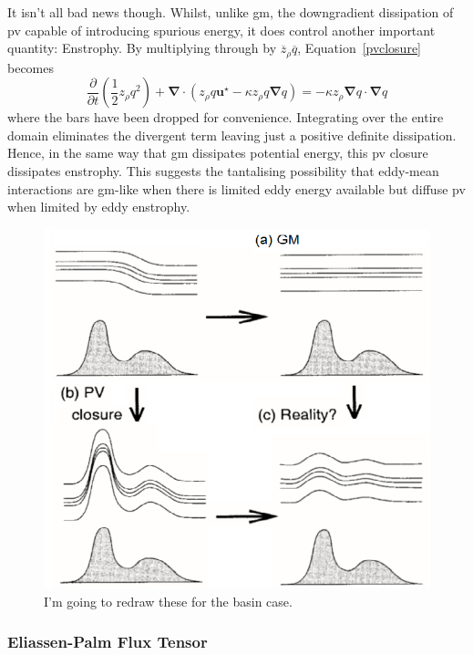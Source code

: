 \documentclass[10pt,a4paper]{article}
\newcommand*\mean[1]{\overline{#1}}
\newcommand*\equref[1]{Equation~\ref{#1}}
\begin{document}
                It isn't all bad news though. Whilst, unlike \gls{gm}, the downgradient
                dissipation of \gls{pv} capable of introducing spurious energy, it does
                control another important quantity: Enstrophy. By multiplying through 
                by $\mean{z}_{\rho} \mean{q}$, \equref{pvclosure} becomes 
                \begin{equation}
                \frac{\partial  }{\partial t}\left(\frac{1}{2}z_{\rho}q^{2}\right) + \boldsymbol{\nabla}\cdot\left(z_{\rho}q\boldsymbol{u}^\star-\kappa z_{\rho}q\boldsymbol{\nabla} q
                \right)=-\kappa z_\rho \boldsymbol{\nabla}q\cdot\boldsymbol{\nabla}q
                \end{equation}
                where the bars have been dropped for convenience.
                Integrating over the entire domain eliminates the divergent term
                leaving just a positive definite dissipation.
                Hence, in the same way that \gls{gm} dissipates potential energy, this
                \gls{pv} closure dissipates enstrophy. This suggests the tantalising
                possibility that eddy-mean interactions are \gls{gm}-like when
                there is limited eddy energy available but diffuse \gls{pv} when
                limited by eddy enstrophy.
                
                \begin{figure}
                	\centering
                	\includegraphics[width=0.6\linewidth]{am00}
                	\caption[Cold-doming]{I'm going to redraw these for the basin case.}
                	\label{fig:Colddoming}
                \end{figure}
                
                
                
                \subsubsection{Eliassen-Palm Flux Tensor}
                
\end{document}
